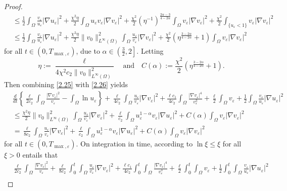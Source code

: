 \documentclass[12pt]{article}
\theoremstyle{plain}
\theoremstyle{definition}
\numberwithin{equation}{section}
\begin{document}
\begin{proof}
\begin{align}
 &\leq\frac{1}{2}\int_{\Omega} \frac{v_{\varepsilon}}{u_{\varepsilon}} |\nabla u_{\varepsilon }|^2 +\frac{\chi^2\eta}{2}\int_{\Omega} u_{\varepsilon}v_{\varepsilon} |\nabla v_{\varepsilon }|^2+\frac{\chi^2}{2}(\eta^{-1})^{\frac{2\alpha-3}{4-2\alpha}}\int_{\Omega} v_{\varepsilon} |\nabla v_{\varepsilon }|^2+\frac{\chi^2}{2}\int_{\{u_{\varepsilon}<1\}} v_{\varepsilon} |\nabla v_{\varepsilon }|^2\nonumber\\
 &\leq\frac{1}{2}\int_{\Omega} \frac{v_{\varepsilon}}{u_{\varepsilon}} |\nabla u_{\varepsilon }|^2 +\frac{\chi^2\eta}{2}\|v_0\|_{L^{\infty}(\Omega)}^2\int_{\Omega} \frac {u_{\varepsilon}}{v_{\varepsilon}} |\nabla v_{\varepsilon }|^2+\frac{\chi^2}{2}(\eta^{\frac{3-2\alpha}{4-2\alpha}}+1)\int_{\Omega} v_{\varepsilon} |\nabla v_{\varepsilon }|^2
\end{align}
for all $t \in(0, T_{\max, \varepsilon})$, due to $\alpha\in\left(\frac{3}{2},2\right]$. Letting
$$
\eta:=\frac{\ell}{4\chi^2c_2\|v_0\|_{L^{\infty}(\Omega)}^2} \quad \text{and} \quad C(\alpha):=\frac{\chi^2}{2}(\eta^{\frac{3-2\alpha}{4-2\alpha}}+1).
$$
Then  combining \eqref{2.25} with  \eqref{2.26} yields
\begin{align*}
    &\frac{d}{dt}\left\{\frac{\ell}{2c_2}\int_{\Omega} \frac{|\nabla v_{\varepsilon}|^2}{v_{\varepsilon}}-\int_{\Omega}\ln{u_{\varepsilon}} \right\}+\frac{\ell}{4c_2} \int_{\Omega} \frac{u_{\varepsilon}}{v_{\varepsilon}} |\nabla v_{\varepsilon }|^2+\frac{\ell c_1}{4c_2}\int_{\Omega} \frac{|\nabla v_{\varepsilon }|^4}{v_{\varepsilon}^3}+\frac{\ell}{2}\int_{\Omega} v_{\varepsilon}+\frac{1}{2}\int_{\Omega} \frac{v_{\varepsilon}}{u_{\varepsilon}} |\nabla u_{\varepsilon }|^2\\
    &\leq \frac{\chi^2\eta}{2}\|v_0\|_{L^{\infty}(\Omega)}^2\int_{\Omega} \frac {u_{\varepsilon}}{v_{\varepsilon}} |\nabla v_{\varepsilon }|^2 +\frac{\ell}{c_2} \int_{\Omega}u_{\varepsilon}^{1-\alpha}v_{\varepsilon}|\nabla u_{\varepsilon }|^2+C(\alpha)\int_{\Omega} v_{\varepsilon} |\nabla v_{\varepsilon }|^2\\
    &= \frac{\ell}{8c_2} \int_{\Omega} \frac{u_{\varepsilon}}{v_{\varepsilon}} |\nabla v_{\varepsilon }|^2 +\frac{\ell}{c_2} \int_{\Omega}u_{\varepsilon}^{1-\alpha}v_{\varepsilon}|\nabla u_{\varepsilon }|^2+C(\alpha)\int_{\Omega} v_{\varepsilon} |\nabla v_{\varepsilon }|^2
\end{align*}
for all $t \in(0, T_{\max, \varepsilon})$. On integration in time, according to $\ln{\xi}\leq \xi$ for all $\xi>0$ entails that
\begin{align}\label{2.27}
   &\frac{\ell}{2c_2}\int_{\Omega} \frac{|\nabla v_{\varepsilon}|^2}{v_{\varepsilon}}+\frac{\ell}{8c_2} \int_0^t\int_{\Omega} \frac{u_{\varepsilon}}{v_{\varepsilon}} |\nabla v_{\varepsilon }|^2+\frac{\ell c_1}{4c_2}\int_0^t\int_{\Omega} \frac{|\nabla v_{\varepsilon }|^4}{v_{\varepsilon}^3}+\frac{\ell}{2}\int_0^t\int_{\Omega} v_{\varepsilon}+\frac{1}{2}\int_0^t\int_{\Omega} \frac{v_{\varepsilon}}{u_{\varepsilon}} |\nabla u_{\varepsilon }|^2\nonumber\\

\end{align}
\end{proof}
\end{document}
